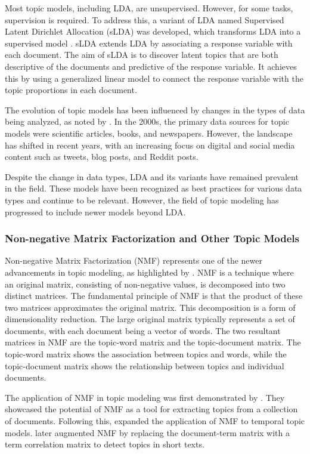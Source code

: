 \documentclass{article}
\begin{document}
Most topic models, including LDA, are unsupervised. However, for some tasks, supervision is required. To address this, a variant of LDA named Supervised Latent Dirichlet Allocation (sLDA) was developed, which transforms LDA into a supervised model \citet{mcauliffe_supervised_2007}. sLDA extends LDA by associating a response variable with each document. The aim of sLDA is to discover latent topics that are both descriptive of the documents and predictive of the response variable. It achieves this by using a generalized linear model to connect the response variable with the topic proportions in each document.

The evolution of topic models has been influenced by changes in the types of data being analyzed, as noted by \citet{churchill_evolution_2022}. In the 2000s, the primary data sources for topic models were scientific articles, books, and newspapers. However, the landscape has shifted in recent years, with an increasing focus on digital and social media content such as tweets, blog posts, and Reddit posts.

Despite the change in data types, LDA and its variants have remained prevalent in the field. These models have been recognized as best practices for various data types and continue to be relevant. However, the field of topic modeling has progressed to include newer models beyond LDA.

\subsubsection{Non-negative Matrix Factorization and Other Topic Models}
Non-negative Matrix Factorization (NMF) represents one of the newer advancements in topic modeling, as highlighted by \citet{churchill_evolution_2022}. NMF is a technique where an original matrix, consisting of non-negative values, is decomposed into two distinct matrices. The fundamental principle of NMF is that the product of these two matrices approximates the original matrix. This decomposition is a form of dimensionality reduction. The large original matrix typically represents a set of documents, with each document being a vector of words. The two resultant matrices in NMF are the topic-word matrix and the topic-document matrix. The topic-word matrix shows the association between topics and words, while the topic-document matrix shows the relationship between topics and individual documents.

The application of NMF in topic modeling was first demonstrated by \citet{shahnaz_document_2006}. They showcased the potential of NMF as a tool for extracting topics from a collection of documents. Following this, \cite{kasiviswanathan_emerging_2011} expanded the application of NMF to temporal topic models. \citet{yan_learning_2013} later augmented NMF by replacing the document-term matrix with a term correlation matrix to detect topics in short texts.
\end{document}
